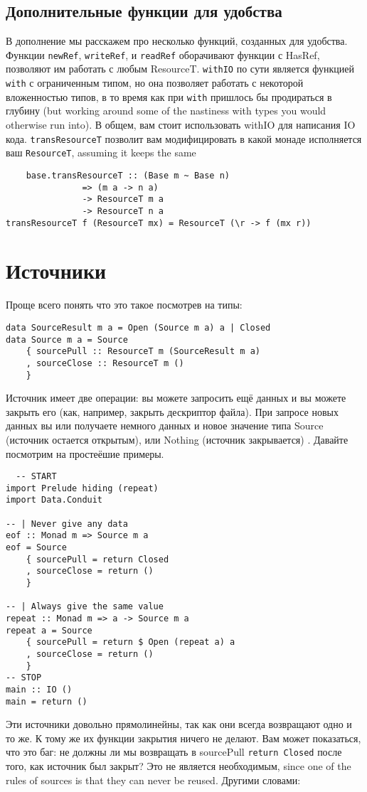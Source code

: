 \subsection{Дополнительные функции для удобства}

В дополнение мы расскажем про несколько функций, созданных для удобства.
%   
Функции \verb=newRef=, \verb=writeRef=, и \verb=readRef= оборачивают
функции с HasRef, позволяют им работать с любым ResourceT.
\verb=withIO= по сути является функцией \verb=with= с ограниченным типом, но она 
позволяет работать с некоторой вложенностью типов, в то время как при \verb=with=
пришлось бы продираться в глубину (but working around 
some of the nastiness with types you would otherwise run into). В общем, вам стоит
использовать withIO для написания IO кода.
\verb=transResourceT= позволит вам модифицировать в какой монаде исполняется ваш
\verb=ResourceT=, assuming it keeps the same
\begin{lstlisting}
    base.transResourceT :: (Base m ~ Base n)
               => (m a -> n a)
               -> ResourceT m a
               -> ResourceT n a
transResourceT f (ResourceT mx) = ResourceT (\r -> f (mx r))
\end{lstlisting}  

\section{Источники}

Проще всего понять что это такое посмотрев  на типы:
\begin{lstlisting}
data SourceResult m a = Open (Source m a) a | Closed
data Source m a = Source
    { sourcePull :: ResourceT m (SourceResult m a)
    , sourceClose :: ResourceT m ()
    }
\end{lstlisting}
Источник имеет две операции: вы можете запросить ещё данных и вы можете закрыть его (как,
например, закрыть дескриптор файла). При запросе новых данных вы или получаете немного
данных и новое  значение типа Source (источник остается открытым), или Nothing (источник
закрывается) . Давайте посмотрим на простеёшие примеры.
\begin{lstlisting}
  -- START
import Prelude hiding (repeat)
import Data.Conduit

-- | Never give any data
eof :: Monad m => Source m a
eof = Source
    { sourcePull = return Closed
    , sourceClose = return ()
    }

-- | Always give the same value
repeat :: Monad m => a -> Source m a
repeat a = Source
    { sourcePull = return $ Open (repeat a) a
    , sourceClose = return ()
    }
-- STOP
main :: IO ()
main = return ()
\end{lstlisting}
Эти источники довольно прямолинейны, так как они всегда возвращают одно и то же. К тому
же их функции закрытия ничего не делают. Вам может показаться, что это баг: не должны ли 
мы возвращать в sourcePull \verb=return Closed= после того, как источник был закрыт? Это
не является необходимым, since one of the rules of sources is
that they can never be
reused. Другими словами:

